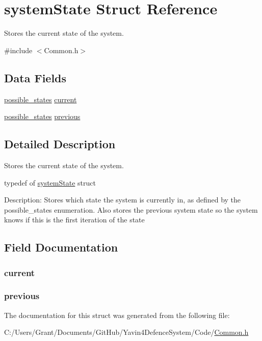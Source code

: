 \hypertarget{structsystemState}{\section{system\+State Struct Reference}
\label{structsystemState}
}


Stores the current state of the system.  




{\ttfamily \#include $<$Common.\+h$>$}

\subsection*{Data Fields}
\begin{DoxyCompactItemize}
\item 
\hyperlink{Common_8h_a05931287b056487cf89495f39026fbe1}{possible\+\_\+states} \hyperlink{structsystemState_a18284a4a782e71c070e1d2e80734509d}{current}
\item 
\hyperlink{Common_8h_a05931287b056487cf89495f39026fbe1}{possible\+\_\+states} \hyperlink{structsystemState_af2f2716b4afa23c8b53a9351a0924b6b}{previous}
\end{DoxyCompactItemize}


\subsection{Detailed Description}
Stores the current state of the system. 



 typedef of \hyperlink{structsystemState}{system\+State} struct

Description\+: Stores which state the system is currently in, as defined by the possible\+\_\+states enumeration. Also stores the previous system state so the system knows if this is the first iteration of the state 

\subsection{Field Documentation}
\hypertarget{structsystemState_a18284a4a782e71c070e1d2e80734509d}{
\subsubsection[{current}]{ current}}\label{structsystemState_a18284a4a782e71c070e1d2e80734509d}
\hypertarget{structsystemState_af2f2716b4afa23c8b53a9351a0924b6b}{
\subsubsection[{previous}]{ previous}}\label{structsystemState_af2f2716b4afa23c8b53a9351a0924b6b}


The documentation for this struct was generated from the following file\+:\begin{DoxyCompactItemize}
\item 
C\+:/\+Users/\+Grant/\+Documents/\+Git\+Hub/\+Yavin4\+Defence\+System/\+Code/\hyperlink{Common_8h}{Common.\+h}\end{DoxyCompactItemize}
